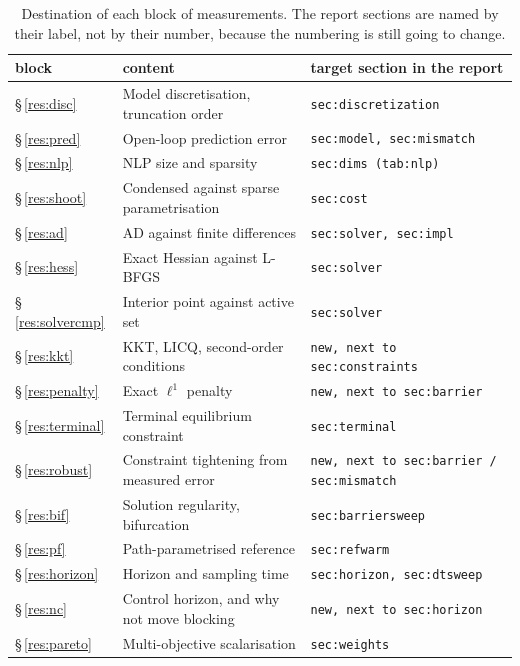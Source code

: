 \begin{table}[htbp]
  \centering
  \small
  \caption{Destination of each block of measurements. The report sections are named by their label, not by their number, because the numbering is still going to change.}
  \label{res:tab:map}
  \begin{tabular}{llp{}}
    \toprule
    block & content & target section in the report \\
    \midrule
    \S\,\ref{res:disc} & Model discretisation, truncation order & \texttt{sec:discretization} \\
    \S\,\ref{res:pred} & Open-loop prediction error & \texttt{sec:model, sec:mismatch} \\
    \S\,\ref{res:nlp} & NLP size and sparsity & \texttt{sec:dims (tab:nlp)} \\
    \S\,\ref{res:shoot} & Condensed against sparse parametrisation & \texttt{sec:cost} \\
    \S\,\ref{res:ad} & AD against finite differences & \texttt{sec:solver, sec:impl} \\
    \S\,\ref{res:hess} & Exact Hessian against L-BFGS & \texttt{sec:solver} \\
    \S\,\ref{res:solvercmp} & Interior point against active set & \texttt{sec:solver} \\
    \S\,\ref{res:kkt} & KKT, LICQ, second-order conditions & \texttt{new, next to sec:constraints} \\
    \S\,\ref{res:penalty} & Exact $\ell^1$ penalty & \texttt{new, next to sec:barrier} \\
    \S\,\ref{res:terminal} & Terminal equilibrium constraint & \texttt{sec:terminal} \\
    \S\,\ref{res:robust} & Constraint tightening from measured error & \texttt{new, next to sec:barrier / sec:mismatch} \\
    \S\,\ref{res:bif} & Solution regularity, bifurcation & \texttt{sec:barriersweep} \\
    \S\,\ref{res:pf} & Path-parametrised reference & \texttt{sec:refwarm} \\
    \S\,\ref{res:horizon} & Horizon and sampling time & \texttt{sec:horizon, sec:dtsweep} \\
    \S\,\ref{res:nc} & Control horizon, and why not move blocking & \texttt{new, next to sec:horizon} \\
    \S\,\ref{res:pareto} & Multi-objective scalarisation & \texttt{sec:weights} \\
    \bottomrule
  \end{tabular}
\end{table}

